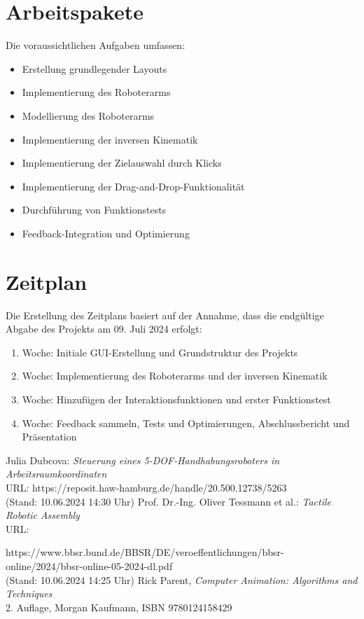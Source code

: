\documentclass[german,a4paper,pdftex,12pt]{article}
\begin{document}
    \section{Arbeitspakete}
    Die voraussichtlichen Aufgaben umfassen:
    \begin{itemize}
        \item Erstellung grundlegender Layouts
        \item Implementierung des Roboterarms
        \item Modellierung des Roboterarms
        \item Implementierung der inversen Kinematik
        \item Implementierung der Zielauswahl durch Klicks
        \item Implementierung der Drag-and-Drop-Funktionalität
        \item Durchführung von Funktionstests
        \item Feedback-Integration und Optimierung
    \end{itemize}

    \newpage

    \section{Zeitplan}
    Die Erstellung des Zeitplans basiert auf der Annahme, dass die endgültige Abgabe des Projekts am 09. Juli 2024 erfolgt:
    \begin{enumerate}
        \item Woche: Initiale GUI-Erstellung und Grundstruktur des Projekts
        \item Woche: Implementierung des Roboterarms und der inversen Kinematik
        \item Woche: Hinzufügen der Interaktionsfunktionen und erster Funktionstest
        \item Woche: Feedback sammeln, Tests und Optimierungen, Abschlussbericht und Präsentation
    \end{enumerate}

    \begin{thebibliography}{20} %
        Julia Dubcova: {\it Steuerung eines 5-DOF-Handhabungsroboters in Arbeitsraumkoordinaten} \\
        URL: https://reposit.haw-hamburg.de/handle/20.500.12738/5263 \\
        (Stand: 10.06.2024 14:30 Uhr)
        Prof. Dr.-Ing. Oliver Tessmann et al.: {\it Tactile Robotic Assembly} \\
        URL:
        \raggedright https://www.bbsr.bund.de/BBSR/DE/veroeffentlichungen/bbsr-online/2024/bbsr-online-05-2024-dl.pdf \\
        (Stand: 10.06.2024 14:25 Uhr)
        Rick Parent, {\it Computer Animation: Algorithms and Techniques} \\
        2. Auflage, Morgan Kaufmann, ISBN 9780124158429
    \end{thebibliography}
\end{document}
